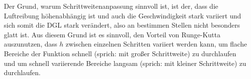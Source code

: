 Der Grund, warum Schrittweitenanpassung sinnvoll ist, ist der, dass die Luftreibung
höhenabhängig ist und auch die Geschwindigkeit stark variiert und sich somit die
DGL stark verändert, also an bestimmen Stellen nicht besonders glatt ist. Aus
diesem Grund ist es sinnvoll, den Vorteil von Runge-Kutta auszunutzen, dass $h$
zwischen einzelnen Schritten variiert werden kann, um flache Bereiche der
Funktion schnell (sprich: mit großer Schrittweite) zu durchlaufen und um schnell
variierende Bereiche langsam (sprich: mit kleiner Schrittweite) zu durchlaufen.
